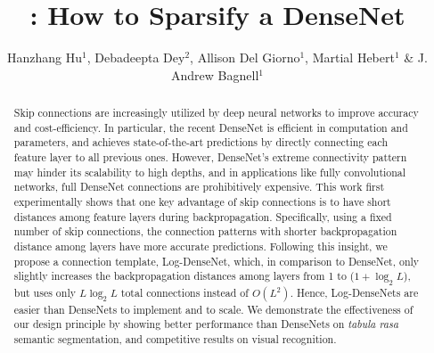 \documentclass{article}
\title{\logdense: How to Sparsify a DenseNet}
\author{Hanzhang Hu$^1$, Debadeepta Dey$^2$, Allison Del Giorno$^1$, Martial Hebert$^1$ \& J. Andrew Bagnell$^1$ \\
\resizebox{\textwidth}{!}{
\begin{tabular}[h]{@{}l}
    $^1$ Carnegie Mellon University\\
    Pittsburgh, PA, USA \\
    \texttt{\{hanzhang,adelgior,hebert,dbagnell\}@cs.cmu.edu}
\end{tabular}
\hfill
\begin{tabular}[h]{l@{}}
    $^2$ Microsoft Research \\
    Redmond, WA, USA \\
    \texttt{dedey@microsoft.com}
\end{tabular}
}
}
\newcommand{\logdense}{Log-DenseNet\xspace}
\newcommand{\logdenses}{Log-DenseNets\xspace}
\begin{document}
\maketitle



\begin{abstract}
Skip connections are increasingly utilized by deep neural networks to improve accuracy and cost-efficiency. 
In particular, the recent DenseNet is efficient in computation and parameters, and achieves state-of-the-art predictions by directly connecting each feature layer to all previous ones. However, DenseNet's extreme connectivity pattern may hinder its scalability to high depths, and in applications like fully convolutional networks, full DenseNet connections are prohibitively expensive. 
This work first experimentally shows that one key advantage of skip connections is to have short distances among feature layers during backpropagation. Specifically, using a fixed number of skip connections, the connection patterns with shorter backpropagation distance among layers have more accurate predictions. Following this insight, we propose a connection template, \logdense, which, in comparison to DenseNet,  only slightly increases the backpropagation distances among layers from 1 to  ($1 + \log_2 L$), but uses only $L\log_2 L$ total connections instead of $O(L^2)$. Hence, \logdenses are easier than DenseNets to implement and to scale. We demonstrate the effectiveness of our design principle by showing better performance than DenseNets on \textit{tabula rasa} semantic segmentation, and competitive results on visual recognition.




\end{abstract}
\end{document}
